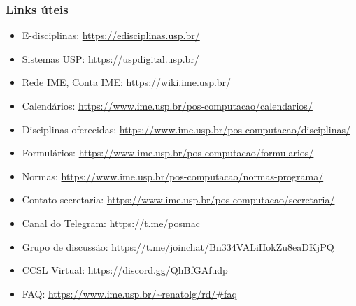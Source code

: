 \documentclass{beamer}
\begin{document}
\begin{frame}
  \frametitle{Links úteis}

  \begin{itemize}
    \item E-disciplinas: {\tiny\url{https://edisciplinas.usp.br/}}
    \item Sistemas USP: {\tiny\url{https://uspdigital.usp.br/}}
    \item Rede IME, Conta IME: {\tiny\url{https://wiki.ime.usp.br/}}
    \item Calendários: {\tiny\url{https://www.ime.usp.br/pos-computacao/calendarios/}}
    \item Disciplinas oferecidas: {\tiny\url{https://www.ime.usp.br/pos-computacao/disciplinas/}}
    \item Formulários: {\tiny\url{https://www.ime.usp.br/pos-computacao/formularios/}}
    \item Normas: {\tiny\url{https://www.ime.usp.br/pos-computacao/normas-programa/}}
    \item Contato secretaria: {\tiny\url{https://www.ime.usp.br/pos-computacao/secretaria/}}
    \item Canal do Telegram: {\tiny\url{https://t.me/posmac}}
    \item Grupo de discussão: {\tiny\url{https://t.me/joinchat/Bn334VALiHokZu8eaDKjPQ}}
    \item CCSL Virtual: {\tiny\url{https://discord.gg/QhBfGAfudp}}
    \item FAQ: {\tiny\url{https://www.ime.usp.br/~renatolg/rd/\#faq}}
  \end{itemize}
\end{frame}
\end{document}
